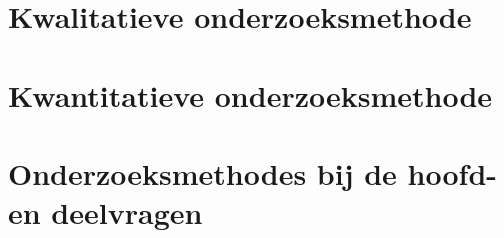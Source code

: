 
\section{Kwalitatieve onderzoeksmethode}

\section{Kwantitatieve onderzoeksmethode}

\section{Onderzoeksmethodes bij de hoofd- en deelvragen}